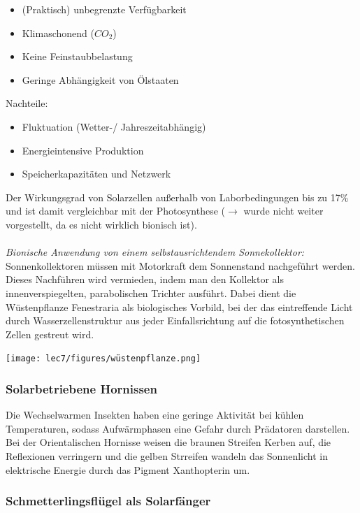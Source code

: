 \begin{itemize}
    \item (Praktisch) unbegrenzte Verfügbarkeit
    \item Klimaschonend ($CO_2$)
    \item Keine Feinstaubbelastung
    \item Geringe Abhängigkeit von Ölstaaten
\end{itemize}
Nachteile:
\begin{itemize}
    \item Fluktuation (Wetter-/ Jahreszeitabhängig)
    \item Energieintensive Produktion
    \item Speicherkapazitäten und Netzwerk
\end{itemize}
Der Wirkungsgrad von Solarzellen außerhalb von Laborbedingungen bis zu 17\% und ist damit vergleichbar mit der Photosynthese ($\rightarrow$ wurde nicht weiter vorgestellt, da es nicht wirklich bionisch ist).
\\\\
\textit{Bionische Anwendung von einem selbstausrichtendem Sonnekollektor:} Sonnenkollektoren müssen mit Motorkraft dem Sonnenstand nachgeführt werden. Dieses Nachführen wird vermieden, indem man den Kollektor als innenverspiegelten, parabolischen Trichter ausführt. Dabei dient die Wüstenpflanze Fenestraria als biologisches Vorbild, bei der das eintreffende Licht durch Wasserzellenstruktur aus jeder Einfallsrichtung auf die fotosynthetischen Zellen gestreut wird.
\begin{center}
    \texttt{[image: lec7/figures/wüstenpflanze.png]}
\end{center}

\subsubsection{Solarbetriebene Hornissen}

Die Wechselwarmen Insekten haben eine geringe Aktivität bei kühlen Temperaturen, sodass Aufwärmphasen eine Gefahr durch Prädatoren darstellen. Bei der Orientalischen Hornisse weisen die braunen Streifen Kerben auf, die Reflexionen verringern und die gelben Strreifen wandeln das Sonnenlicht in elektrische Energie durch das Pigment Xanthopterin um.

\subsubsection{Schmetterlingsflügel als Solarfänger}

